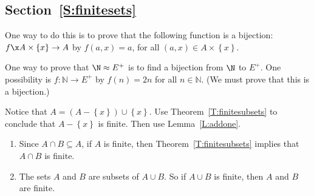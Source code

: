\subsection*{Section~\ref{S:finitesets}}

\begin{list}{\bf{\ref{exer:sec92-1}.}}
\item One way to do this is to prove that the following function is a bijection:  $f\x A \times \left\{ x \right\} \to A$ by $f ( a, x ) = a$, for all 
$( a, x ) \in A \times \left\{ x \right\}$.
\end{list}


\begin{list}{\bf{\ref{exer91:evennaturals}.}}
\item One way to prove that $\N \approx E^+$ is to find a bijection from $\N$ to $E^+$.  One possibility is $f: \mathbb{N} \to E^+$ by $f \left( n \right) = 2n$ for all $n \in \mathbb{N}$.  (We must prove that this is a bijection.)
\end{list}


\begin{list}{\bf{\ref{exer:sec92corollary}.}}
\item Notice that $A = ( A - \left\{ x \right\} ) \cup \left\{x \right\}$.  Use 
Theorem~\ref{T:finitesubsets} to conclude that $A - \left\{ x \right\}$ is finite.  Then use 
Lemma~\ref{L:addone}.
\end{list}


\begin{list}{\bf{\ref{exer:sec92-finitesets}.}}
\item \begin{enumerate}
\item Since $A \cap B \subseteq A$, if $A$ is finite, then Theorem~\ref{T:finitesubsets} implies that $A \cap B$ is finite.
\item The sets $A$ and $B$ are subsets of $A \cup B$.  So if $A \cup B$ is finite, then $A$ and $B$ are finite.
\end{enumerate}
\end{list}


